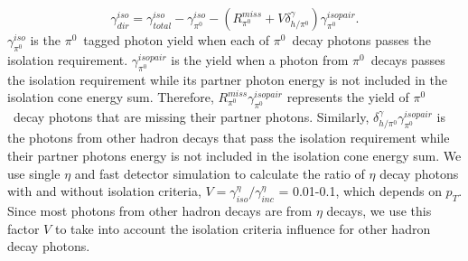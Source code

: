 \documentclass[twocolumn,letterpaper,aps,prl,longbibliography,superscriptaddress,floatfix]{revtex4-2}
\newcommand{\pT}{\ensuremath{p_T}}
\newcommand{\pizero}{\ensuremath{\pi^0}}
\begin{document}
\begin{equation} \label{eq:iso}
\gamma_{dir}^{iso} = \gamma_{total}^{iso} - \gamma_{\pi^0}^{iso} - \left( R_{\pi^0}^{miss} + V\delta_{h/\pi^0}^{\gamma} \right) \gamma_{\pi^0}^{isopair}.
\end{equation}
$\gamma_{\pi^0}^{iso}$ is the \pizero \ tagged photon yield when each of \pizero\ decay photons passes the isolation requirement. $\gamma_{\pi^0}^{isopair}$ is the yield when a photon from \pizero\ decays passes the isolation requirement while its partner photon energy is not included in the isolation cone energy sum. Therefore, $R_{\pi^0}^{miss}\gamma_{\pi^0}^{isopair}$ represents the yield of \pizero\ decay photons that are missing their partner photons. Similarly, $\delta_{h/\pi^0}^{\gamma}\gamma_{\pi^0}^{isopair}$ is the photons from other hadron decays that pass the isolation requirement while their partner photons energy is not included in the isolation cone energy sum. We use single $\eta$ and fast detector simulation to calculate the ratio of $\eta$ decay photons with and without isolation criteria, $V = \gamma_{iso}^{\eta}/\gamma_{inc}^{\eta}$ = 0.01-0.1, which depends on \pT. Since most photons from other hadron decays are from $\eta$ decays, we use this factor $V$ to take into account the isolation criteria influence for other hadron decay photons.

\end{document}
